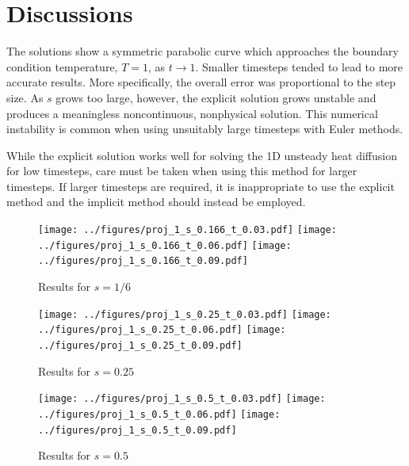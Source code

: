\documentclass[twocolumn,10pt]{asme2ej}
\begin{document}

\section{Discussions}

The solutions show a symmetric parabolic curve which approaches the boundary condition temperature, $T=1$, as $t \rightarrow 1$. Smaller timesteps tended to lead to more accurate results. More specifically, the overall error was proportional to the step size. As $s$ grows too large, however, the explicit solution grows unstable and produces a meaningless noncontinuous, nonphysical solution. This numerical instability is common when using unsuitably large timesteps with Euler methods.

While the explicit solution works well for solving the 1D unsteady heat diffusion for low timesteps, care must be taken when using this method for larger timesteps. If larger timesteps are required, it is inappropriate to use the explicit method and the implicit method should instead be employed.

 \begin{figure}[b]
\begin{center}
\texttt{[image: ../figures/proj\_1\_s\_0.166\_t\_0.03.pdf]}
\texttt{[image: ../figures/proj\_1\_s\_0.166\_t\_0.06.pdf]}
\texttt{[image: ../figures/proj\_1\_s\_0.166\_t\_0.09.pdf]}
\caption{Results for $s = 1/6$}
\end{center}
\end{figure}

\begin{figure}[htb]
\begin{center}
\texttt{[image: ../figures/proj\_1\_s\_0.25\_t\_0.03.pdf]}
\texttt{[image: ../figures/proj\_1\_s\_0.25\_t\_0.06.pdf]}
\texttt{[image: ../figures/proj\_1\_s\_0.25\_t\_0.09.pdf]}
\caption{Results for $s = 0.25$}
\end{center}
\end{figure}

\begin{figure}[htb]
\begin{center}
\texttt{[image: ../figures/proj\_1\_s\_0.5\_t\_0.03.pdf]}
\texttt{[image: ../figures/proj\_1\_s\_0.5\_t\_0.06.pdf]}
\texttt{[image: ../figures/proj\_1\_s\_0.5\_t\_0.09.pdf]}
\caption{Results for $s = 0.5$}
\end{center}
\end{figure}
\end{document}
